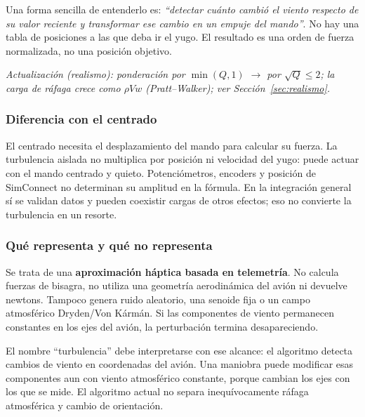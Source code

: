 \documentclass[11pt,a4paper]{article}
\begin{document}
Una forma sencilla de entenderlo es: \emph{``detectar cuánto cambió el viento respecto de su valor reciente y transformar ese cambio en un empuje del mando''}. No hay una tabla de posiciones a las que deba ir el yugo. El resultado es una orden de fuerza normalizada, no una posición objetivo.

\textit{Actualización (realismo): ponderación por $\min(Q,1)$ $\rightarrow$ por $\sqrt Q\le2$; la carga de ráfaga crece como $\rho Vw$ (Pratt--Walker); ver Sección~\ref{sec:realismo}.}

\subsubsection{Diferencia con el centrado}
El centrado necesita el desplazamiento del mando para calcular su fuerza. La turbulencia aislada no multiplica por posición ni velocidad del yugo: puede actuar con el mando centrado y quieto. Potenciómetros, encoders y posición de SimConnect no determinan su amplitud en la fórmula. En la integración general sí se validan datos y pueden coexistir cargas de otros efectos; eso no convierte la turbulencia en un resorte.

\subsubsection{Qué representa y qué no representa}
Se trata de una \textbf{aproximación háptica basada en telemetría}. No calcula fuerzas de bisagra, no utiliza una geometría aerodinámica del avión ni devuelve newtons. Tampoco genera ruido aleatorio, una senoide fija o un campo atmosférico Dryden/Von Kármán. Si las componentes de viento permanecen constantes en los ejes del avión, la perturbación termina desapareciendo.

El nombre ``turbulencia'' debe interpretarse con ese alcance: el algoritmo detecta cambios de viento en coordenadas del avión. Una maniobra puede modificar esas componentes aun con viento atmosférico constante, porque cambian los ejes con los que se mide. El algoritmo actual no separa inequívocamente ráfaga atmosférica y cambio de orientación.
\end{document}
